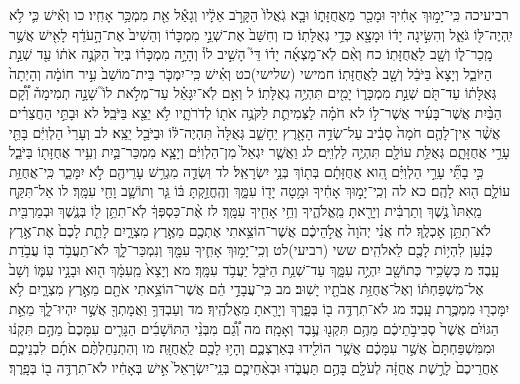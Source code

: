 \documentclass[twoside, openany, parskip=half, 11pt]{book}
\begin{document}
רביעיכה כִּֽי־יָמ֣וּךְ אָחִ֔יךָ וּמָכַ֖ר מֵאֲחֻזָּת֑וֹ וּבָ֤א גֹֽאֲלוֹ֙ הַקָּרֹ֣ב אֵלָ֔יו וְגָאַ֕ל אֵ֖ת מִמְכַּ֥ר אָחִֽיו׃ כו וְאִ֕ישׁ כִּ֛י לֹ֥א יִֽהְיֶה־לּ֖וֹ גֹּאֵ֑ל וְהִשִּׂ֣יגָה יָד֔וֹ וּמָצָ֖א כְּדֵ֥י גְאֻלָּתֽוֹ׃ כז וְחִשַּׁב֙ אֶת־שְׁנֵ֣י מִמְכָּר֔וֹ וְהֵשִׁיב֙ אֶת־הָ֣עֹדֵ֔ף לָאִ֖ישׁ אֲשֶׁ֣ר מָֽכַר־ל֑וֹ וְשָׁ֖ב לַאֲחֻזָּתֽוֹ׃ כח וְאִ֨ם לֹֽא־מָצְאָ֜ה יָד֗וֹ דֵּי֮ הָשִׁ֣יב לוֹ֒ וְהָיָ֣ה מִמְכָּר֗וֹ בְּיַד֙ הַקֹּנֶ֣ה אֹת֔וֹ עַ֖ד שְׁנַ֣ת הַיּוֹבֵ֑ל וְיָצָא֙ בַּיֹּבֵ֔ל וְשָׁ֖ב לַאֲחֻזָּתֽוֹ׃
חמישי (שלישי)כט וְאִ֗ישׁ כִּֽי־יִמְכֹּ֤ר בֵּית־מוֹשַׁב֙ עִ֣יר חוֹמָ֔ה וְהָיְתָה֙ גְּאֻלָּת֔וֹ עַד־תֹּ֖ם שְׁנַ֣ת מִמְכָּר֑וֹ יָמִ֖ים תִּהְיֶ֥ה גְאֻלָּתֽוֹ׃ ל וְאִ֣ם לֹֽא־יִגָּאֵ֗ל עַד־מְלֹ֣את לוֹ֮ שָׁנָ֣ה תְמִימָה֒ וְ֠קָ֠ם הַבַּ֨יִת אֲשֶׁר־בָּעִ֜יר אֲשֶׁר־ל֣וֹ לא חֹמָ֗ה לַצְּמִיתֻ֛ת לַקֹּנֶ֥ה אֹת֖וֹ לְדֹרֹתָ֑יו לֹ֥א יֵצֵ֖א בַּיֹּבֵֽל׃ לא וּבָתֵּ֣י הַחֲצֵרִ֗ים אֲשֶׁ֨ר אֵין־לָהֶ֤ם חֹמָה֙ סָבִ֔יב עַל־שְׂדֵ֥ה הָאָ֖רֶץ יֵחָשֵׁ֑ב גְּאֻלָּה֙ תִּהְיֶה־לּ֔וֹ וּבַיֹּבֵ֖ל יֵצֵֽא׃ לב וְעָרֵי֙ הַלְוִיִּ֔ם בָּתֵּ֖י עָרֵ֣י אֲחֻזָּתָ֑ם גְּאֻלַּ֥ת עוֹלָ֖ם תִּהְיֶ֥ה לַלְוִיִּֽם׃ לג וַאֲשֶׁ֤ר יִגְאַל֙ מִן־הַלְוִיִּ֔ם וְיָצָ֧א מִמְכַּר־בַּ֛יִת וְעִ֥יר אֲחֻזָּת֖וֹ בַּיֹּבֵ֑ל כִּ֣י בָתֵּ֞י עָרֵ֣י הַלְוִיִּ֗ם הִ֚וא אֲחֻזָּתָ֔ם בְּת֖וֹךְ בְּנֵ֥י יִשְׂרָאֵֽל׃ לד וּֽשְׂדֵ֛ה מִגְרַ֥שׁ עָרֵיהֶ֖ם לֹ֣א יִמָּכֵ֑ר כִּֽי־אֲחֻזַּ֥ת עוֹלָ֛ם ה֖וּא לָהֶֽם׃
כא לה וְכִֽי־יָמ֣וּךְ אָחִ֔יךָ וּמָ֥טָה יָד֖וֹ עִמָּ֑ךְ וְהֶֽחֱזַ֣קְתָּ בּ֔וֹ גֵּ֧ר וְתוֹשָׁ֛ב וָחַ֖י עִמָּֽךְ׃ לו אַל־תִּקַּ֤ח מֵֽאִתּוֹ֙ נֶ֣שֶׁךְ וְתַרְבִּ֔ית וְיָרֵ֖אתָ מֵֽאֱלֹהֶ֑יךָ וְחֵ֥י אָחִ֖יךָ עִמָּֽךְ׃ לז אֶ֨ת־כַּסְפְּךָ֔ לֹֽא־תִתֵּ֥ן ל֖וֹ בְּנֶ֑שֶׁךְ וּבְמַרְבִּ֖ית לֹא־תִתֵּ֥ן אׇכְלֶֽךָ׃ לח אֲנִ֗י יְהֹוָה֙ אֱלֹ֣הֵיכֶ֔ם אֲשֶׁר־הוֹצֵ֥אתִי אֶתְכֶ֖ם מֵאֶ֣רֶץ מִצְרָ֑יִם לָתֵ֤ת לָכֶם֙ אֶת־אֶ֣רֶץ כְּנַ֔עַן לִהְי֥וֹת לָכֶ֖ם לֵאלֹהִֽים׃
ששי (רביעי)לט וְכִֽי־יָמ֥וּךְ אָחִ֛יךָ עִמָּ֖ךְ וְנִמְכַּר־לָ֑ךְ לֹא־תַעֲבֹ֥ד בּ֖וֹ עֲבֹ֥דַת עָֽבֶד׃ מ כְּשָׂכִ֥יר כְּתוֹשָׁ֖ב יִהְיֶ֣ה עִמָּ֑ךְ עַד־שְׁנַ֥ת הַיֹּבֵ֖ל יַעֲבֹ֥ד עִמָּֽךְ׃ מא וְיָצָא֙ מֵֽעִמָּ֔ךְ ה֖וּא וּבָנָ֣יו עִמּ֑וֹ וְשָׁב֙ אֶל־מִשְׁפַּחְתּ֔וֹ וְאֶל־אֲחֻזַּ֥ת אֲבֹתָ֖יו יָשֽׁוּב׃ מב כִּֽי־עֲבָדַ֣י הֵ֔ם אֲשֶׁר־הוֹצֵ֥אתִי אֹתָ֖ם מֵאֶ֣רֶץ מִצְרָ֑יִם לֹ֥א יִמָּכְר֖וּ מִמְכֶּ֥רֶת עָֽבֶד׃ מג לֹא־תִרְדֶּ֥ה ב֖וֹ בְּפָ֑רֶךְ וְיָרֵ֖אתָ מֵאֱלֹהֶֽיךָ׃ מד וְעַבְדְּךָ֥ וַאֲמָתְךָ֖ אֲשֶׁ֣ר יִהְיוּ־לָ֑ךְ מֵאֵ֣ת הַגּוֹיִ֗ם אֲשֶׁר֙ סְבִיבֹ֣תֵיכֶ֔ם מֵהֶ֥ם תִּקְנ֖וּ עֶ֥בֶד וְאָמָֽה׃ מה וְ֠גַ֠ם מִבְּנֵ֨י הַתּוֹשָׁבִ֜ים הַגָּרִ֤ים עִמָּכֶם֙ מֵהֶ֣ם תִּקְנ֔וּ וּמִמִּשְׁפַּחְתָּם֙ אֲשֶׁ֣ר עִמָּכֶ֔ם אֲשֶׁ֥ר הוֹלִ֖ידוּ בְּאַרְצְכֶ֑ם וְהָי֥וּ לָכֶ֖ם לַֽאֲחֻזָּֽה׃ מו וְהִתְנַחַלְתֶּ֨ם אֹתָ֜ם לִבְנֵיכֶ֤ם אַחֲרֵיכֶם֙ לָרֶ֣שֶׁת אֲחֻזָּ֔ה לְעֹלָ֖ם בָּהֶ֣ם תַּעֲבֹ֑דוּ וּבְאַ֨חֵיכֶ֤ם בְּנֵֽי־יִשְׂרָאֵל֙ אִ֣ישׁ בְּאָחִ֔יו לֹא־תִרְדֶּ֥ה ב֖וֹ בְּפָֽרֶךְ׃
\end{document}
